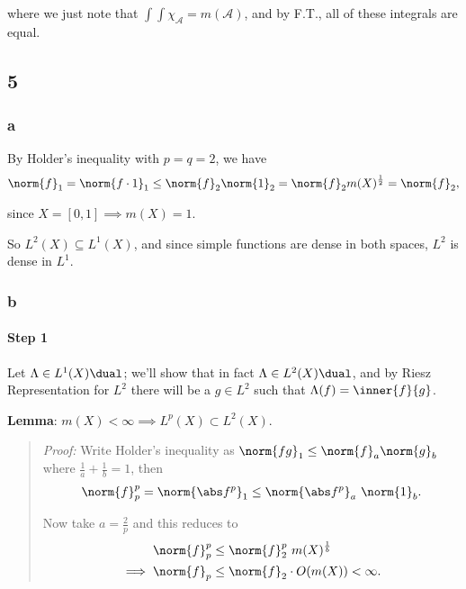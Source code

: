 where we just note that \(\int \int \chi_\mathcal{A} = m(\mathcal{A})\),
and by F.T., all of these integrals are equal.

\hypertarget{section-4}{%
\subsection{5}\label{section-4}}

\hypertarget{a-3}{%
\subsubsection{a}\label{a-3}}

By Holder's inequality with \(p=q=2\), we have \begin{align*}
\norm{f}_1 = \norm{f\cdot 1}_1 \leq \norm{f}_2 \norm{1}_2 = \norm{f}_2 m(X)^{\frac 1 2} = \norm{f}_2,
\end{align*}

since \(X = [0, 1] \implies m(X) = 1\).

So \(L^2(X) \subseteq L^1(X)\), and since simple functions are dense in
both spaces, \(L^2\) is dense in \(L^1\).

\hypertarget{b-3}{%
\subsubsection{b}\label{b-3}}

\hypertarget{step-1}{%
\paragraph{Step 1}\label{step-1}}

Let \(\Lambda \in L^1(X)\dual\); we'll show that in fact
\(\Lambda \in L^2(X)\dual\), and by Riesz Representation for \(L^2\)
there will be a \(g\in L^2\) such that \(\Lambda(f) = \inner{f}{g}\).

\textbf{Lemma}: \(m(X) < \infty \implies L^p(X) \subset L^2(X)\).

\begin{quote}
\emph{Proof:} Write Holder's inequality as
\(\norm{fg}_1 \leq \norm{f}_a \norm{g}_b\) where
\(\frac 1 a + \frac 1 b = 1\), then \begin{align*}
\norm{f}_p^p = \norm{\abs f^p}_1 \leq \norm{\abs f^p}_a ~\norm{1}_b
.\end{align*}

Now take \(a = \frac 2 p\) and this reduces to \begin{align*}
\norm{f}_p^p &\leq \norm{f}_2^p ~m(X)^{\frac 1 b} \\
\implies \norm{f}_p &\leq \norm{f}_2 \cdot O(m(X)) < \infty
.\end{align*}
\end{quote}

